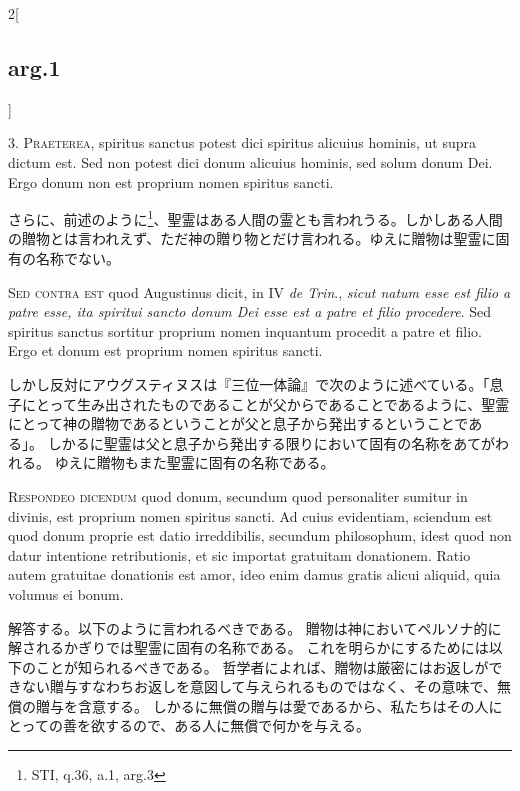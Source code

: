 \documentclass[paper=a4paper,fontsize=10pt,jafontsize=9pt,titlepage]{jlreq}
\begin{document}
\begin{paracol}{2}[\subsection{arg.1}]

3. \textsc{Praeterea}, spiritus sanctus potest dici spiritus alicuius hominis, ut supra dictum est. Sed non potest dici donum alicuius hominis, sed solum donum Dei. Ergo donum non est proprium nomen spiritus sancti.

\switchcolumn

さらに、前述のように\footnote{STI, q.36, a.1, arg.3}、聖霊はある人間の霊とも言われうる。しかしある人間の贈物とは言われえず、ただ神の贈り物とだけ言われる。ゆえに贈物は聖霊に固有の名称でない。

\switchcolumn*[\subsection{s.c.}]

\textsc{Sed contra est} quod Augustinus dicit, in IV \textit{de Trin}., \textit{sicut natum esse est filio a patre esse, ita spiritui sancto donum Dei esse est a patre et filio procedere}. Sed spiritus sanctus sortitur proprium nomen inquantum procedit a patre et filio. Ergo et donum est proprium nomen spiritus sancti.

\switchcolumn

しかし反対にアウグスティヌスは『三位一体論』で次のように述べている。「息子にとって生み出されたものであることが父からであることであるように、聖霊にとって神の贈物であるということが父と息子から発出するということである」。
しかるに聖霊は父と息子から発出する限りにおいて固有の名称をあてがわれる。
ゆえに贈物もまた聖霊に固有の名称である。


\textsc{Respondeo dicendum} quod donum, secundum quod personaliter sumitur in
divinis, est proprium nomen spiritus sancti. Ad cuius evidentiam, sciendum est
quod donum proprie est datio irreddibilis, secundum philosophum, idest quod non
datur intentione retributionis, et sic importat gratuitam donationem. Ratio
autem gratuitae donationis est amor, ideo enim damus gratis alicui aliquid,
quia volumus ei bonum.

\switchcolumn

解答する。以下のように言われるべきである。
贈物は神においてペルソナ的に解されるかぎりでは聖霊に固有の名称である。
これを明らかにするためには以下のことが知られるべきである。
哲学者によれば、贈物は厳密にはお返しができない贈与すなわちお返しを意図して与えられるものではなく、その意味で、無償の贈与を含意する。
しかるに無償の贈与は愛であるから、私たちはその人にとっての善を欲するので、ある人に無償で何かを与える。


\end{paracol}
\end{document}
